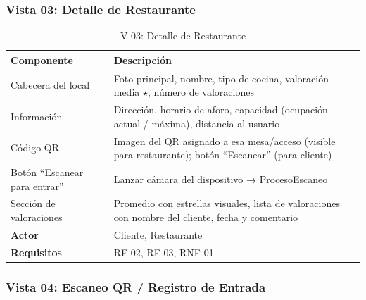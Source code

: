 \subsubsection{Vista 03: Detalle de Restaurante}

\begin{table}[H]
    \centering
    \caption{V-03: Detalle de Restaurante}
    \label{tab:vista03}
    \begin{tabular}{|>{\raggedright\arraybackslash}p{}|>{\raggedright\arraybackslash}p{}|}
        \hline
        \textbf{Componente} & \textbf{Descripción} \\
        \hline
        Cabecera del local & Foto principal, nombre, tipo de cocina, valoración media $\star$, número de valoraciones \\
        \hline
        Información & Dirección, horario de aforo, capacidad (ocupación actual / máxima), distancia al usuario \\
        \hline
        Código QR & Imagen del QR asignado a esa mesa/acceso (visible para restaurante); botón ``Escanear'' (para cliente) \\
        \hline
        Botón ``Escanear para entrar'' & Lanzar cámara del dispositivo → ProcesoEscaneo \\
        \hline
        Sección de valoraciones & Promedio con estrellas visuales, lista de valoraciones con nombre del cliente, fecha y comentario \\
        \hline
        \textbf{Actor} & Cliente, Restaurante \\
        \hline
        \textbf{Requisitos} & RF-02, RF-03, RNF-01 \\
        \hline
    \end{tabular}
\end{table}

\subsubsection{Vista 04: Escaneo QR / Registro de Entrada}

